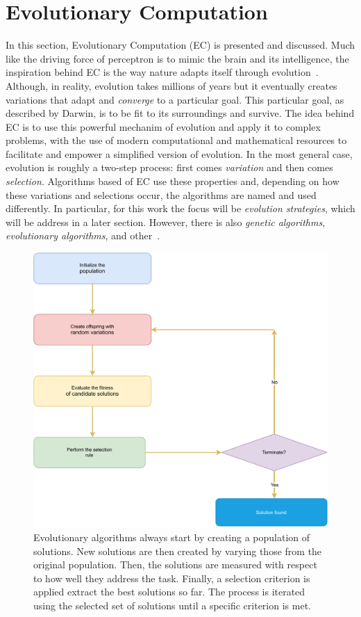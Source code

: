 \section{Evolutionary Computation}
In this section, Evolutionary Computation (EC) is presented and discussed. Much like the 
driving force of perceptron is to mimic the brain and its intelligence, the inspiration 
behind EC is the way nature adapts itself through 
evolution~\cite{fogelWhatEvolutionaryComputation2000}. Although, in reality, evolution 
takes millions of years but it eventually creates variations that adapt and \emph{converge} 
to a particular goal. This particular goal, as described by Darwin, is to be fit to its 
surroundings and survive. The idea behind EC is to use this powerful mechanim of evolution 
and apply it to complex problems, with the use of modern computational and mathematical 
resources to facilitate and empower a simplified version of evolution. In the most general 
case, evolution is roughly a two-step process: first comes \emph{variation} and then comes 
\emph{selection}. Algorithms based of EC use these properties and, depending on how these 
variations and selections occur, the algorithms are named and used differently. In 
particular, for this work the focus will be \emph{evolution strategies}, which will be 
address in a later section. However, there is also \emph{genetic algorithms}, 
\emph{evolutionary algorithms}, and other~\cite{kacprzykSpringerHandbookComputational2015}.

\begin{figure}
    \centering
    \includegraphics[scale=0.67]{figuras/capitulo-3/evolutionary-optimization.pdf}
    \caption{Evolutionary algorithms always start by creating a population of solutions. New solutions are then created by varying those from the original population. Then, the solutions are measured with respect to how well they address the task. Finally, a selection criterion is applied extract the best solutions so far. The process is iterated using the selected set of solutions until a specific criterion is met.}
    \label{fig:evolutionary-optimization}
\end{figure}

